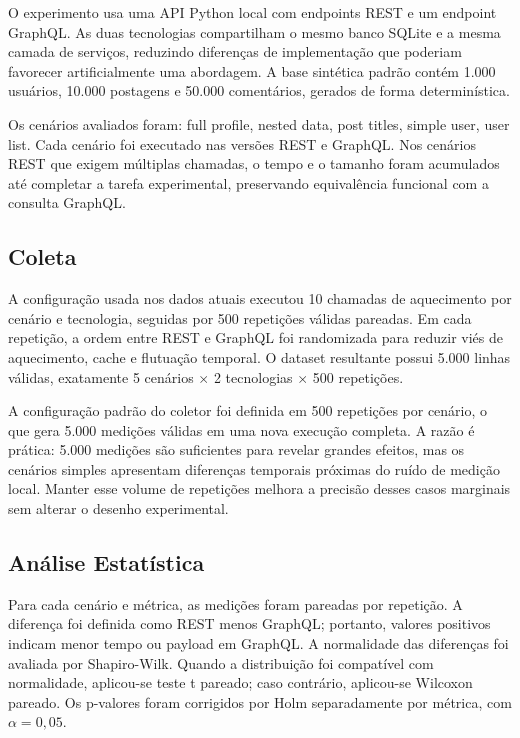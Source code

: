 \documentclass[journal]{IEEEtran}
\begin{document}
O experimento usa uma API Python local com endpoints REST e um endpoint GraphQL. As duas tecnologias compartilham o mesmo banco SQLite e a mesma camada de serviços, reduzindo diferenças de implementação que poderiam favorecer artificialmente uma abordagem. A base sintética padrão contém 1.000 usuários, 10.000 postagens e 50.000 comentários, gerados de forma determinística.

Os cenários avaliados foram: full profile, nested data, post titles, simple user, user list. Cada cenário foi executado nas versões REST e GraphQL. Nos cenários REST que exigem múltiplas chamadas, o tempo e o tamanho foram acumulados até completar a tarefa experimental, preservando equivalência funcional com a consulta GraphQL.

\subsection{Coleta}

A configuração usada nos dados atuais executou 10 chamadas de aquecimento por cenário e tecnologia, seguidas por 500 repetições válidas pareadas. Em cada repetição, a ordem entre REST e GraphQL foi randomizada para reduzir viés de aquecimento, cache e flutuação temporal. O dataset resultante possui 5.000 linhas válidas, exatamente 5 cenários $\times$ 2 tecnologias $\times$ 500 repetições.

A configuração padrão do coletor foi definida em 500 repetições por cenário, o que gera 5.000 medições válidas em uma nova execução completa. A razão é prática: 5.000 medições são suficientes para revelar grandes efeitos, mas os cenários simples apresentam diferenças temporais próximas do ruído de medição local. Manter esse volume de repetições melhora a precisão desses casos marginais sem alterar o desenho experimental.

\subsection{Análise Estatística}

Para cada cenário e métrica, as medições foram pareadas por repetição. A diferença foi definida como REST menos GraphQL; portanto, valores positivos indicam menor tempo ou payload em GraphQL. A normalidade das diferenças foi avaliada por Shapiro-Wilk. Quando a distribuição foi compatível com normalidade, aplicou-se teste t pareado; caso contrário, aplicou-se Wilcoxon pareado. Os p-valores foram corrigidos por Holm separadamente por métrica, com $\alpha = 0{,}05$.
\end{document}
